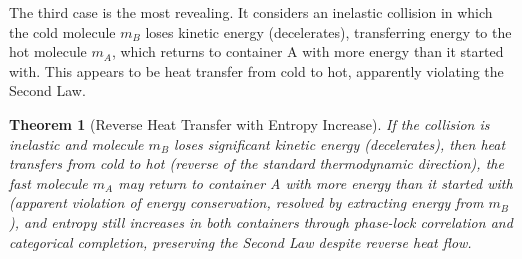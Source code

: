 \documentclass[12pt,a4paper]{article}
\newtheorem{theorem}{Theorem}[section]
\theoremstyle{definition}
\theoremstyle{remark}
\begin{document}
The third case is the most revealing. It considers an inelastic collision in which the cold molecule $m_B$ loses kinetic energy (decelerates), transferring energy to the hot molecule $m_A$, which returns to container A with more energy than it started with. This appears to be heat transfer from cold to hot, apparently violating the Second Law.

\begin{theorem}[Reverse Heat Transfer with Entropy Increase]
\label{thm:reverse_heat}
If the collision is inelastic and molecule $m_B$ loses significant kinetic energy (decelerates), then heat transfers from cold to hot (reverse of the standard thermodynamic direction), the fast molecule $m_A$ may return to container A with more energy than it started with (apparent violation of energy conservation, resolved by extracting energy from $m_B$), and entropy still increases in both containers through phase-lock correlation and categorical completion, preserving the Second Law despite reverse heat flow.
\end{theorem}
\end{document}
